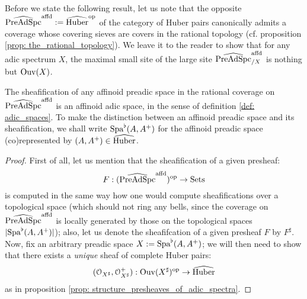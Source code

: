             \begin{remark}
                Before we state the following result, let us note that the opposite $\widehat{\mathrm{Pre}\mathrm{Ad}\mathrm{Spc}}^{\mathrm{affd}} := \widehat{\mathrm{Huber}}^{\mathrm{op}}$ of the category of Huber pairs canonically admits a coverage whose covering sieves are covers in the rational topology (cf. proposition \ref{prop: the_rational_topology}). We leave it to the reader to show that for any adic spectrum $X$, the maximal small site of the large site $\widehat{\mathrm{Pre}\mathrm{Ad}\mathrm{Spc}}^{\mathrm{affd}}_{/X}$ is nothing but $\mathrm{Ouv}(X)$.
            \end{remark}
            \begin{theorem} \label{theorem: sheafifying_pre_adic_spaces}
                The sheafification of any affinoid preadic space in the rational coverage on $\widehat{\mathrm{Pre}\mathrm{Ad}\mathrm{Spc}}^{\mathrm{affd}}$ is an affinoid adic space, in the sense of definition \ref{def: adic_spaces}. To make the distinction between an affinoid preadic space and its sheafification, we shall write $\mathrm{Spa}^{\flat}(A, A^+)$ for the affinoid preadic space (co)represented by $(A, A^+) \in \widehat{\mathrm{Huber}}$.
            \end{theorem}
                \begin{proof}
                    First of all, let us mention that the sheafification of a given presheaf:
                        $$F: (\widehat{\mathrm{Pre}\mathrm{Ad}\mathrm{Spc}}^{\mathrm{affd}})^{\mathrm{op}} \to \mathrm{Sets}$$
                    is computed in the same way how one would compute sheafifications over a topological space (which should not ring any bells, since the coverage on $\widehat{\mathrm{Pre}\mathrm{Ad}\mathrm{Spc}}^{\mathrm{affd}}$ is locally generated by those on the topological spaces $|\mathrm{Spa}^{\flat}(A, A^+)|$); also, let us denote the sheafifcation of a given presheaf $F$ by $F^{\sharp}$. Now, fix an arbitrary preadic space $X := \mathrm{Spa}^{\flat}(A, A^+)$; we will then need to show that there exists a \textit{unique} sheaf of complete Huber pairs:
                        $$(\mathcal{O}_{X^{\sharp}}, \mathcal{O}_{X^{\sharp}}^+): \mathrm{Ouv}(X^{\sharp})^{\mathrm{op}} \to \widehat{\mathrm{Huber}}$$
                    as in proposition \ref{prop: structure_presheaves_of_adic_spectra}. 
                \end{proof}
            \begin{example}
                
            \end{example}
            
